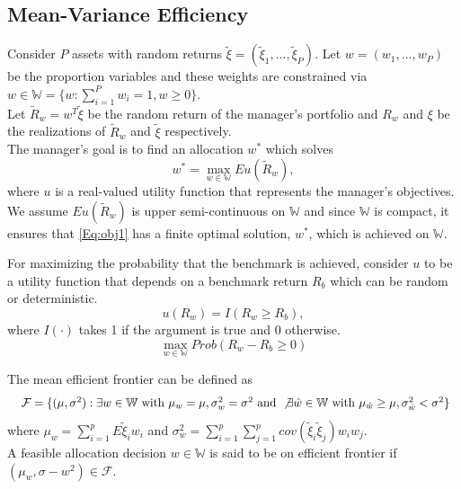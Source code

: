 			\subsection{Mean-Variance Efficiency}
				Consider $P$ assets with random returns $\tilde{\xi} = (\tilde{\xi}_1,\dots,\tilde{\xi}_P)$. Let $w=(w_1,\dots,w_P)$ be the proportion variables and these weights are constrained via $w\in \mathbb{W}= \{w:\sum_{i=1}^{P}w_i=1,w\ge 0\}$.\\
				Let $\tilde{R}_w = w^T\tilde{\xi}$ be the random return of the manager's portfolio and $R_w$ and $\xi$ be the realizations of $\tilde{R}_w$ and $\tilde{\xi}$ respectively.\\
				The manager's goal is to find an allocation $w^*$ which solves
				\begin{equation}\label{Eq:obj1}
					w^* = \max_{w\in\mathbb{W}	} Eu(\tilde{R}_w),
				\end{equation}
				where $u$ is a real-valued utility function that represents the manager's objectives.\\

				We assume $Eu(\tilde{R}_w)$ is upper semi-continuous on $\mathbb{W}$ and since $\mathbb{W}$ is compact, it ensures that \eqref{Eq:obj1} has a finite optimal solution, $w^*$, which is achieved on $\mathbb{W}$.

				For maximizing the probability that the benchmark is achieved, consider $u$ to be a utility function that depends on a benchmark return $R_b$ which can be random or deterministic.
				\begin{equation}\label{Eq:utilfunc}
					u(R_w) = I(R_w \ge R_b),
				\end{equation}
				where $I(\cdot)$ takes 1 if the argument is true and 0 otherwise.\\


				\begin{equation}\label{Eq:maxProb2}
					\max_{w\in\mathbb{W}}Prob(R_w-R_b \ge 0)
				\end{equation}

				\begin{defn}\label{dfn:mean-var}
					The mean efficient frontier can be defined as
					\begin{equation*}\label{Eq:mean-eff}
						\resizebox{\hsize}{!}{
							$\mathcal{F} = \{
							(\mu,\sigma^2) :
							\exists w\in \mathbb{W} \text{ with }  \mu_w=\mu, \sigma_w^2=\sigma^2 \text{ and }
							\not\exists \hat{w}\in \mathbb{W} \text{ with }  \mu_{\hat{w}} \ge \mu, \sigma_{\hat{w}}^2 < \sigma^2
							\}
							$}
					\end{equation*} where $\mu_w = \sum_{i=1}^{p}E\tilde{\xi}_i w_i$ and $\sigma_w^2 = \sum_{i=1}^{p}\sum_{j=1}^{p} cov(\tilde{\xi}_i \tilde{\xi}_j)w_i w_j$. \\
					A feasible allocation decision $w\in\mathbb{W}$ is said to be on efficient frontier if $(\mu_w,\sigma-w^2) \in \mathcal{F}$.
				\end{defn}


